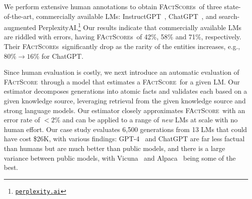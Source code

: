 \documentclass[11pt]{article}
\newcommand{\ours}{\textsc{FActScore}}
\newcommand{\ourScore}{\textsc{FActScore}}
\newcommand{\ourScores}{\textsc{FActScore}s}
\newcommand{\subjectLM}{LM$_\textsc{subj}$}
\newcommand{\sewon}[1]{\textcolor{magenta}{[Sewon: #1]}
}
\newcommand{\kalpesh}[1]{\textcolor{brown}{[Kalpesh: #1]}
}
\newcommand{\mohit}[1]{\textcolor{blue}{[Mohit: #1]}
}
\newcommand{\pw}[1]{%
}
\begin{document}
%
We perform extensive human annotations to obtain \ourScores\ of three state-of-the-art, commercially available LMs: InstructGPT~\citep{ouyang2022training}, ChatGPT~\citep{chatgpt}, and search-augmented PerplexityAI.\footnote{\label{fn:ppl}\href{https://www.perplexity.ai/}{\texttt{perplexity.ai}}}
Our results indicate that commercially available LMs are riddled with errors, having \ourScores\ of 42\%, 58\% and 71\%, respectively.
Their \ourScores\ significantly drop as the rarity of the entities increases, e.g., $80\%\rightarrow16\%$ for ChatGPT.

Since human evaluation is costly, we next introduce an automatic evaluation of \ours\ through a model that estimates a \ourScore\ for a given LM.
Our estimator decomposes generations into atomic facts and validates each based on a given knowledge source, leveraging retrieval from the given knowledge source and strong language models.
Our estimator closely approximates \ours\ with an error rate of $<2\%$
%
and can be applied to a range of {\em new} LMs at scale with no human effort.
Our case study evaluates 6,500 generations from 13 LMs that could have cost \$26K, %
with various findings: %
GPT-4~\citep{OpenAI2023GPT4TR} and ChatGPT are far less factual than humans %
but are much better than public models,
and there is a large variance between public models, with %
Vicuna~\citep{vicuna2023} and Alpaca~\citep{alpaca} being some of the best.
\end{document}
